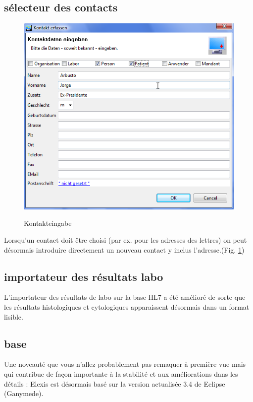 \documentclass[a4paper]{scrartcl}
\begin{document}
\subsection{sélecteur des contacts}
\begin{figure}
  \includegraphics{kontakt}\\
  \caption{Kontakteingabe}\label{fig:kontakt}
\end{figure}

Lorsqu'un contact doit être choisi (par ex. pour les adresses des lettres) on peut désormais introduire directement un nouveau contact y inclus l'adresse.(Fig. \ref{fig:kontakt})

\subsection{importateur des résultats labo}
L'importateur des résultats de labo sur la base HL7 a été amélioré de sorte que les résultats histologiques et cytologiques apparaissent désormais dans un format lisible. 

\subsection{base}
Une noveauté que vous n'allez probablement pas remaquer à première vue mais qui contribue de façon importante à la stabilité et aux améliorations dans les détails : Elexis est désormais basé sur la version  actualisée 3.4 de Eclipse (Ganymede).
\end{document}
